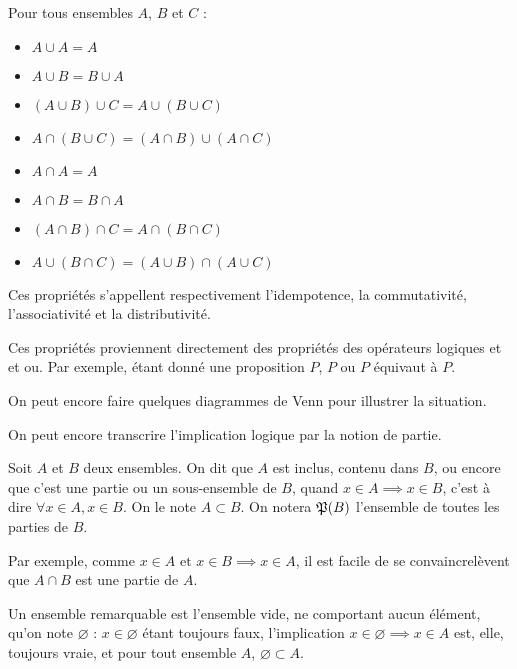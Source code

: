 \begin{prop}
    Pour tous ensembles $A$, $B$ et $C$ :
    \begin{multicols}{2}
    \begin{itemize}
        \item $A\cup A=A$
        \item $A\cup B=B\cup A$
        \item $(A\cup B)\cup C = A\cup(B\cup C)$ 
        \item $A\cap(B\cup C)=(A\cap B) \cup (A\cap C)$
        \item $A\cap A=A$
        \item $A\cap B=B\cap A$
        \item $(A\cap B)\cap C = A\cap(B\cap C)$
        \item $A\cup(B\cap C)=(A\cup B) \cap (A\cup C)$
    \end{itemize}
\end{multicols}
    Ces propriétés s'appellent respectivement l'idempotence, la commutativité, l'associativité et la distributivité.
\end{prop}
\begin{demo}
    Ces propriétés proviennent directement des propriétés des opérateurs logiques et et ou. Par exemple, étant donné une proposition $P$, $P$ ou $P$ équivaut à $P$.
\end{demo}

On peut encore faire quelques diagrammes de Venn pour illustrer la situation.

\medskip
{}

On peut encore transcrire l'implication logique par la notion de partie.

\begin{defini}[Parties]
    Soit $A$ et $B$ deux ensembles. On dit que $A$ est inclus, contenu dans $B$, ou encore que c'est une partie ou un sous-ensemble de $B$, quand $x\in A \implies x\in B$, c'est à dire $\forall x\in A, x\in B$. On le note $A\subset B$. On notera $\mathfrak{P}(B)$ l'ensemble de toutes les parties de $B$.
\end{defini}

Par exemple, comme $x\in A \text{ et } x\in B \implies x\in A$, il est facile de se convaincrelèvent que $A\cap B$ est une partie de $A$.

Un ensemble remarquable est l'ensemble vide, ne comportant aucun élément, qu'on note $\varnothing$ : $x\in\varnothing$ étant toujours faux, l'implication $x\in\varnothing \implies x\in A$ est, elle, toujours vraie, et pour tout ensemble $A$, $\varnothing \subset A$.  

